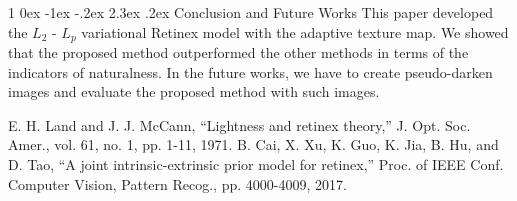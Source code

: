 \documentclass[a4paper,twocolumn,10pt]{article}
\makeatletter
\renewcommand{\section}{%
  \@startsection{section}%
   {1}%
   {\z@}%
   {0ex \@plus -1ex \@minus -.2ex}%
   {2.3ex \@plus.2ex}%
   {\normalfont\large\bfseries}%
}%
\makeatother
\begin{document}
\section{Conclusion and Future Works}
\vspace{-0.3cm}
This paper developed the $L_{2}$ - $L_{p}$ variational Retinex model with the adaptive texture map.
We showed that the proposed method outperformed the other methods in terms of the indicators of naturalness.
In the future works, we have to create pseudo-darken images and evaluate the proposed method with such images.
\vspace{0.2cm}
\begin{thebibliography}{9}
\vspace{-0.2cm}
 E. H. Land and J. J. McCann, ``Lightness and retinex theory,'' J. Opt. Soc. Amer., vol. 61, no. 1, pp. 1-11, 1971.
 B. Cai, X. Xu, K. Guo, K. Jia, B. Hu, and D. Tao, ``A joint intrinsic-extrinsic prior model for retinex,'' Proc. of IEEE Conf. Computer Vision, Pattern Recog., pp. 4000-4009, 2017.
\end{thebibliography}
\end{document}
